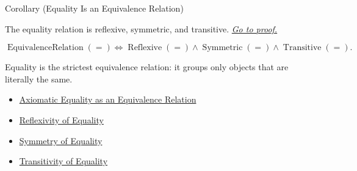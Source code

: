 \begin{corollarybox}{Corollary (Equality Is an Equivalence Relation)}
\begin{corollary}
\label{cor:equality-is-equivalence-relation}
The equality relation is reflexive, symmetric, and transitive.
\hyperref[prf:equality-is-equivalence-relation]{\textit{Go to proof.}}
\end{corollary}
\end{corollarybox}

\begin{remark*}
\[
\operatorname{EquivalenceRelation}(=)
\Longleftrightarrow
\operatorname{Reflexive}(=)\land\operatorname{Symmetric}(=)\land\operatorname{Transitive}(=).
\]
\end{remark*}

\begin{remark*}[Interpretation]
Equality is the strictest equivalence relation: it groups only objects that
are literally the same.
\end{remark*}

\begin{dependencies}
\begin{itemize}
  \item \hyperref[thm:axiomatic-equality-equivalence-relation]{Axiomatic Equality as an Equivalence Relation}
  \item \hyperref[ax:equality-reflexivity]{Reflexivity of Equality}
  \item \hyperref[thm:equality-symmetry]{Symmetry of Equality}
  \item \hyperref[thm:equality-transitivity]{Transitivity of Equality}
\end{itemize}
\end{dependencies}
